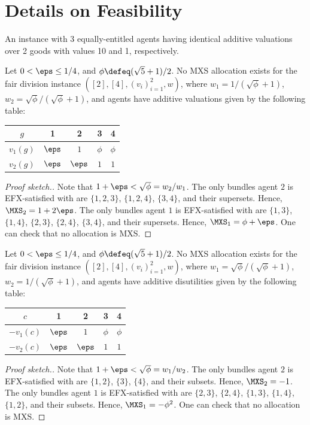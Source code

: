 \section{Details on Feasibility}
\label{sec:feas-extra}

\begin{example}
\label{cex:propx}
An instance with 3 equally-entitled agents having identical additive valuations over 2 goods
with values 10 and 1, respectively.
\end{example}

\begin{lemma}
\label{cex:wmxs-goods}
Let $0 < \eps \le 1/4$, and $\phi \defeq (\sqrt{5}+1)/2$.
No MXS allocation exists for the fair division instance $([2], [4], (v_i)_{i=1}^2, w)$,
where $w_1 = 1/(\sqrt{\phi}+1)$, $w_2 = \sqrt{\phi}/(\sqrt{\phi}+1)$,
and agents have additive valuations given by the following table:

\centering
\begin{tabular}{c|cccc}
$g$ & 1 & 2 & 3 & 4
\\ \hline $v_1(g)$ & $\eps$ & $1$ & $\phi$ & $\phi$
\\ $v_2(g)$ & $\eps$ & $\eps$ & $1$ & $1$
\end{tabular}
\end{lemma}
\begin{proof}[Proof sketch.]
Note that $1 + \eps < \sqrt{\phi} = w_2/w_1$.
The only bundles agent $2$ is EFX-satisfied with are
$\{1, 2, 3\}$, $\{1, 2, 4\}$, $\{3, 4\}$, and their supersets.
Hence, $\MXS_2 = 1 + 2\eps$.
%
The only bundles agent $1$ is EFX-satisfied with are
$\{1, 3\}$, $\{1, 4\}$, $\{2, 3\}$, $\{2, 4\}$, $\{3, 4\}$, and their supersets.
Hence, $\MXS_1 = \phi + \eps$.
%
One can check that no allocation is MXS.
\end{proof}

\begin{lemma}
\label{cex:wmxs-chores}
Let $0 < \eps \le 1/4$, and $\phi \defeq (\sqrt{5}+1)/2$.
No MXS allocation exists for the fair division instance $([2], [4], (v_i)_{i=1}^2, w)$,
where $w_1 = \sqrt{\phi}/(\sqrt{\phi}+1)$, $w_2 = 1/(\sqrt{\phi}+1)$,
and agents have additive disutilities given by the following table:

\centering
\begin{tabular}{c|cccc}
$c$ & 1 & 2 & 3 & 4
\\ \hline $-v_1(c)$ & $\eps$ & $1$ & $\phi$ & $\phi$
\\ $-v_2(c)$ & $\eps$ & $\eps$ & $1$ & $1$
\end{tabular}
\end{lemma}
\begin{proof}[Proof sketch.]
Note that $1 + \eps < \sqrt{\phi} = w_1/w_2$.
The only bundles agent $2$ is EFX-satisfied with are
$\{1, 2\}$, $\{3\}$, $\{4\}$, and their subsets.
Hence, $\MXS_2 = -1$.
%
The only bundles agent $1$ is EFX-satisfied with are
$\{2, 3\}$, $\{2, 4\}$, $\{1, 3\}$, $\{1, 4\}$, $\{1, 2\}$, and their subsets.
Hence, $\MXS_1 = -\phi^2$.
%
One can check that no allocation is MXS.
\end{proof}
